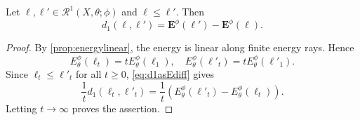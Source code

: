 \begin{proposition}\label{prop:d1geod_diff_E}
    Let $\ell,\ell'\in \mathcal{R}^1(X,\theta;\phi)$ and $\ell\leq \ell'$. Then
    \begin{equation}\label{eq:d1rayscompa}
        d_1(\ell,\ell')=\mathbf{E}^{\phi}(\ell')-\mathbf{E}^{\phi}(\ell).
    \end{equation}
\end{proposition}
\begin{proof}
    By \cref{prop:energylinear}, the energy is linear along finite energy rays. Hence
    \[
        E_{\theta}^{\phi}(\ell_t)=tE_{\theta}^{\phi}(\ell_1),\quad E_{\theta}^{\phi}(\ell'_t)=tE_{\theta}^{\phi}(\ell'_1).
    \]
    Since $\ell_t\leq \ell'_t$ for all $t\geq 0$, \eqref{eq:d1asEdiff} gives
    \[
        \frac{1}{t}d_1(\ell_t,\ell'_t)=\frac{1}{t}\left(E_{\theta}^{\phi}(\ell'_t)-E_{\theta}^{\phi}(\ell_t)\right).
    \]
    Letting $t\to\infty$ proves the assertion.
\end{proof}





